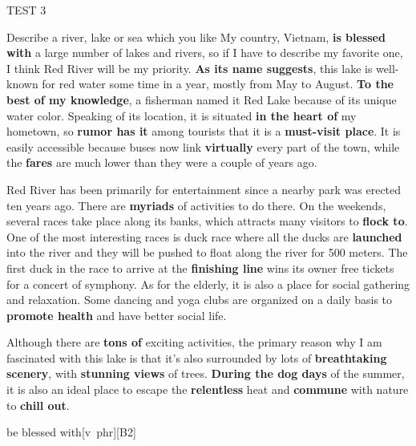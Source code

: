 \begin{glossarymc}[Cambridge 4]
\begin{test}{TEST 3}
\begin{qa}{Describe a river, lake or sea which you like}
		My country, Vietnam, \textbf{is blessed with} a large number of lakes and rivers, so if I have to describe my favorite one, I think Red River will be my priority. \textbf{As its name suggests}, this lake is well-known for red water some time in a year, mostly from May to August. \textbf{To the best of my knowledge}, a fisherman named it Red Lake because of its unique water color. Speaking of its location, it is situated \textbf{in the heart of} my hometown, so \textbf{rumor has it} among tourists that it is a \textbf{must-visit place}. It is easily accessible because buses now link \textbf{virtually} every part of the town, while the \textbf{fares} are much lower than they were a couple of years ago.

		Red River has been primarily for entertainment since a nearby park was erected ten years ago. There are \textbf{myriads} of activities to do there. On the weekends, several races take place along its banks, which attracts many visitors to \textbf{flock to}. One of the most interesting races is duck race where all the ducks are \textbf{launched} into the river and they will be pushed to float along the river for 500 meters. The first duck in the race to arrive at the \textbf{finishing line} wins its owner free tickets for a concert of symphony. As for the elderly, it is also a place for social gathering and relaxation. Some dancing and yoga clubs are organized on a daily basis to \textbf{promote health} and have better social life.

		Although there are \textbf{tons of} exciting activities, the primary reason why I am fascinated with this lake is that it's also surrounded by lots of \textbf{breathtaking scenery}, with \textbf{stunning views} of trees. \textbf{During the dog days} of the summer, it is also an ideal place to escape the \textbf{relentless} heat and \textbf{commune} with nature to \textbf{chill out}.
	\end{qa}

        \begin{VocabExplain}[Part 2]
			\begin{ExplainCard}{be blessed with}[v~phr][B2]
			\end{ExplainCard}


\end{VocabExplain}
\end{test}
\end{glossarymc}
